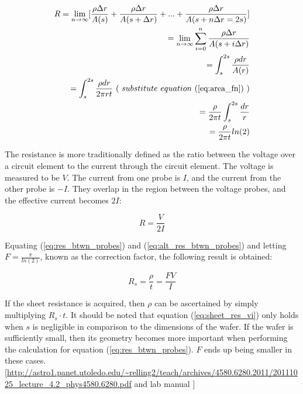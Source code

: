 \begin{equation}
	\label{eq:res_btwn_probes}
	\begin{aligned}
	R = \lim_{n\to\infty} [ \frac{ \rho \Delta r }{ A(s) } + \frac{ \rho \Delta r }{ A(s + \Delta r) } + ... + \frac{ \rho \Delta r }{ A(s + n \Delta r = 2s ) } ] \\
	= \lim_{n\to\infty} \sum_{i=0}^{n} \frac{ \rho \Delta r }{ A( s + i\Delta r )} \\
	= \int_{s}^{2s} \frac{ \rho dr }{ A(r) } \\
	= \int_{s}^{2s} \frac{ \rho dr }{ 2 \pi r t } \ ( \ substitute \ equation \ (\ref{eq:area_fn}) \ ) \\
	= \frac{ \rho }{ 2 \pi t } \int_{s}^{2s} \frac{ dr }{ r } \\
	= \frac{ \rho }{ 2 \pi t } ln(2)
	\end{aligned}
\end{equation}

The resistance is more traditionally defined as the ratio between the voltage over a circuit element to the current through the circuit element. The voltage is measured to be $V$. The current from one probe is $I$, and the current from the other probe is $-I$. They overlap in the region between the voltage probes, and the effective current becomes $2I$:

\begin{equation}
	\label{eq:alt_res_btwn_probes}
	R = \frac{V}{2I}
\end{equation}

Equating (\ref{eq:res_btwn_probes}) and (\ref{eq:alt_res_btwn_probes}) and letting $F = \frac{\pi}{ln(2)}$, known as the correction factor, the following result is obtained:

\begin{equation}
	\label{eq:sheet_res_vi}
	R_s = \frac{\rho}{t} = \frac{ FV }{ I }
\end{equation}

If the sheet resistance is acquired, then $\rho$ can be ascertained by simply multiplying $R_s \cdot t$. It should be noted that equation (\ref{eq:sheet_res_vi}) only holds when $s$ is negligible in comparison to the dimensions of the wafer. If the wafer is sufficiently small, then its geometry becomes more important when performing the calculation for equation (\ref{eq:res_btwn_probes}). $F$ ends up being smaller in these cases. [\url{http://astro1.panet.utoledo.edu/~relling2/teach/archives/4580.6280.2011/20111025_lecture_4.2_phys4580.6280.pdf} and lab manual ] %

